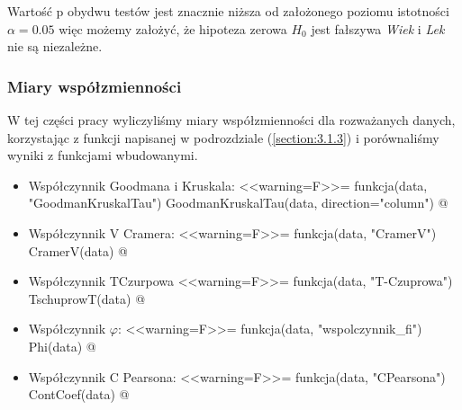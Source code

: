 \documentclass[12pt]{mwart}
\begin{document}
Wartość p obydwu testów jest znacznie niższa od założonego poziomu istotności $\alpha=0.05$ więc możemy założyć, że hipoteza zerowa $H_0$ jest fałszywa \pauza \emph{Wiek} i \emph{Lek} nie są niezależne.
\subsubsection{Miary współzmienności}
W tej części pracy wyliczyliśmy miary współzmienności dla rozważanych danych, korzystając z funkcji napisanej w podrozdziale (\ref{section:3.1.3}) i porównaliśmy wyniki z funkcjami wbudowanymi.

\begin{itemize}[label=$\bullet$]
	\item Współczynnik Goodmana i Kruskala:
	<<warning=F>>=
	funkcja(data, "GoodmanKruskalTau")
	GoodmanKruskalTau(data, direction="column")
	@
	
	\item Współczynnik V Cramera:
	<<warning=F>>=
	funkcja(data, "CramerV")
	CramerV(data)
	@
	
	\item Współczynnik T{\dywiz}Czurpowa
	<<warning=F>>=
	funkcja(data, "T-Czuprowa")
	TschuprowT(data)
	@
	
	\item Współczynnik $\varphi$:
	<<warning=F>>=
	funkcja(data, "wspolczynnik_fi")
	Phi(data)
	@
	
	\item Współczynnik C Pearsona:
	<<warning=F>>=
	funkcja(data, "CPearsona")
	ContCoef(data)
	@
\end{itemize}
\end{document}
